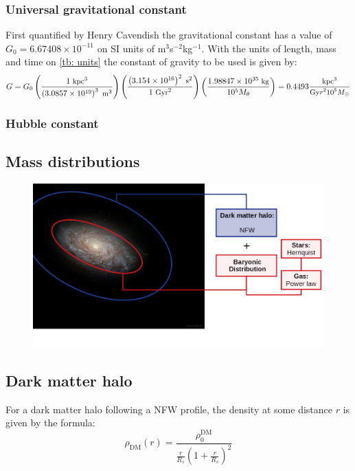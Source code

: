 		\subsubsection{Universal gravitational constant}
			First quantified by Henry Cavendish the gravitational constant has a value of $G_0 = 6.67408\times10^{-11}$ on SI units of m$^3$s$^{-2}$kg$^{-1}$. With the units of length, mass and time on \autoref{tb: units} the constant of gravity to be used is given by:
			\begin{equation}
				\small
				G = G_0 \left(\dfrac{1 \text{ kpc}^3}{\left(3.0857\times10^{19}\right)^3  \text{ m}^3}\right)\left(\dfrac{\left(3.154\times10^{16}\right)^2 \text{ s}^2}{1 \text{ Gyr}^2}\right)\left(\dfrac{1.98847\times10^{35} \text{ kg}}{10^5 M_\theta}\right) = 0.4493 \dfrac{\text{kpc$^3$}}{\text{Gy$r^210^5$$M_\odot$}}
			\end{equation}
			
		\subsubsection{Hubble constant}
	\subsection{Mass distributions}
		\begin{figure}[h]
			\centering
			\includegraphics[width=0.7\linewidth]{Figures/NGC4414_modified}
		\end{figure}
	\subsection{Dark matter halo}
		For a dark matter halo following a NFW profile, the density at some distance $r$ is given by the formula:
		\begin{equation}
			\rho_\text{DM}(r) = \dfrac{\rho_0^\text{DM}}{\frac{r}{R_s}\left(1 + \frac{r}{R_s}\right)^2}
		\end{equation}
		
